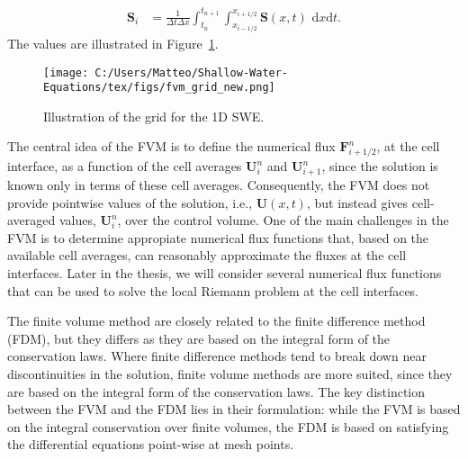 \begin{align*}
    \mathbf{S}_i &= \frac{1}{\Delta t \Delta x} \int_{t_n}^{t_{n+1}} \int_{x_{i-1/2}}^{x_{i+1/2}} \mathbf{S}(x,t) \text{ d}x\text{d}t.
\end{align*}
The values are illustrated in Figure~\ref{fig:10_3}.
\begin{figure}[H]
    \centering
    \texttt{[image: C:/Users/Matteo/Shallow-Water-Equations/tex/figs/fvm\_grid\_new.png]}
    \caption{Illustration of the grid for the 1D SWE.}\label{fig:10_3}
\end{figure}
The central idea of the FVM is to define the numerical flux $\mathbf{F}_{i+1/2}^n$, at the cell interface, as a function of the cell averages $\mathbf{U}_i^n$ and $\mathbf{U}_{i+1}^n$, since the solution is known only in terms of these cell averages.
Consequently, the FVM does not provide pointwise values of the solution, i.e., $\mathbf{U}(x,t)$, but instead gives cell-averaged values, $\mathbf{U}_i^n$, over the control volume.
One of the main challenges in the FVM is to determine appropiate numerical flux functions that, based on the available cell averages, can reasonably approximate the fluxes at the cell interfaces. 
Later in the thesis, we will consider several numerical flux functions that can be used to solve the local Riemann problem at the cell interfaces.

The finite volume method are closely related to the finite difference method (FDM), but they differs as they are based on the integral form of the conservation laws.
Where finite difference methods tend to break down near discontinuities in the solution, finite volume methods are more suited, since they are based on the integral form of the conservation laws.
The key distinction between the FVM and the FDM lies in their formulation: while the FVM is based on the integral conservation over finite volumes, the FDM is based on satisfying the differential equations point-wise at mesh points.

